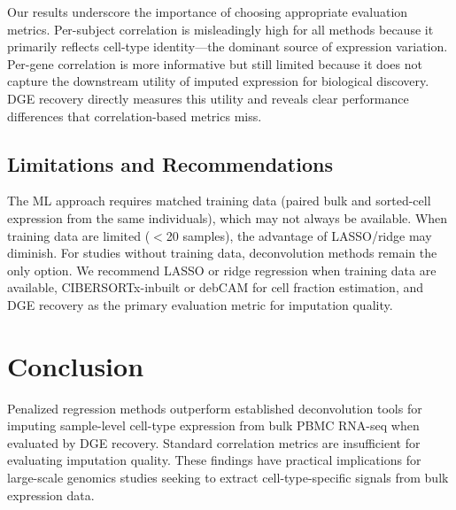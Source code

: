 \documentclass[12pt]{article}
\begin{document}
Our results underscore the importance of choosing appropriate evaluation metrics. Per-subject correlation is misleadingly high for all methods because it primarily reflects cell-type identity---the dominant source of expression variation. Per-gene correlation is more informative but still limited because it does not capture the downstream utility of imputed expression for biological discovery. DGE recovery directly measures this utility and reveals clear performance differences that correlation-based metrics miss.

\subsection{Limitations and Recommendations}

The ML approach requires matched training data (paired bulk and sorted-cell expression from the same individuals), which may not always be available. When training data are limited ($<$20 samples), the advantage of LASSO/ridge may diminish. For studies without training data, deconvolution methods remain the only option. We recommend LASSO or ridge regression when training data are available, CIBERSORTx-inbuilt or debCAM for cell fraction estimation, and DGE recovery as the primary evaluation metric for imputation quality.

\section{Conclusion}

Penalized regression methods outperform established deconvolution tools for imputing sample-level cell-type expression from bulk PBMC RNA-seq when evaluated by DGE recovery. Standard correlation metrics are insufficient for evaluating imputation quality. These findings have practical implications for large-scale genomics studies seeking to extract cell-type-specific signals from bulk expression data.



\end{document}
